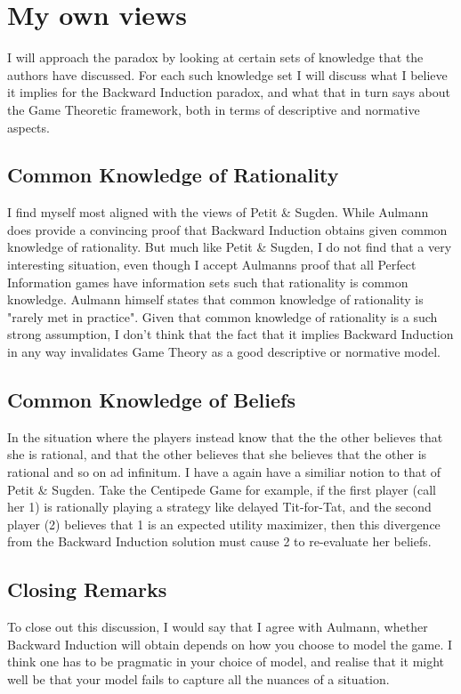 \documentclass{article}
\begin{document}
\section{My own views}
I will approach the paradox by looking at certain sets of knowledge that the authors have discussed. For each such knowledge set I will discuss what I believe it implies for the Backward Induction paradox, and what that in turn says about the Game Theoretic framework, both in terms of descriptive and normative aspects.

\subsection{Common Knowledge of Rationality}

I find myself most aligned with the views of Petit \& Sugden. While Aulmann does provide a convincing proof that Backward Induction obtains given common knowledge of rationality. But much like Petit \& Sugden, I do not find that a very interesting situation, even though I accept Aulmanns proof that all Perfect Information games have information sets such that rationality is common knowledge. Aulmann himself states that common knowledge of rationality is "rarely met in practice". Given that common knowledge of rationality is a such strong assumption, I don't think that the fact that it implies Backward Induction in any way invalidates Game Theory as a good descriptive or normative model.

\subsection{Common Knowledge of Beliefs}

In the situation where the players instead know that the the other believes that she is rational, and that the other believes that she believes that the other is rational and so on ad infinitum. I have a again have a similiar notion to that of Petit \& Sugden. Take the Centipede Game for example, if the first player (call her 1) is rationally playing a strategy like delayed Tit-for-Tat, and the second player (2) believes that 1 is an expected utility maximizer, then this divergence from the Backward Induction solution must cause 2 to re-evaluate her beliefs. 

\subsection {Closing Remarks} 

To close out this discussion, I would say that I agree with Aulmann, whether Backward Induction will obtain depends on how you choose to model the game. I think one has to be pragmatic in your choice of model, and realise that it might well be that your model fails to capture all the nuances of a situation.
\end{document}
